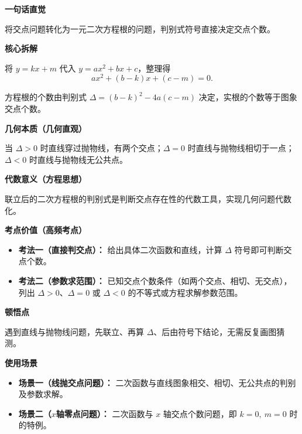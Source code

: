 \begin{explanationbox}
	\textbf{\textcolor{CExplanation}{一句话直觉}}

	将交点问题转化为一元二次方程根的问题，判别式符号直接决定交点个数。

	\medskip
	\textbf{\textcolor{CExplanation}{核心拆解}}
	\begin{description}[style=nextline, leftmargin=2.8em, labelsep=0.5em, itemsep=0.45em]
		\item[\textbf{要点一（代数转化）：}]
		      将 $y=kx+m$ 代入 $y=ax^{2}+bx+c$，整理得
		      \[
			      ax^{2}+(b-k)x+(c-m)=0.
		      \]
		\item[\textbf{要点二（判别式判根）：}]
		      方程根的个数由判别式 $\Delta=(b-k)^{2}-4a(c-m)$ 决定，实根的个数等于图象交点个数。
	\end{description}

	\medskip
	\textbf{\textcolor{CExplanation}{几何本质（几何直观）}}

	当 $\Delta>0$ 时直线穿过抛物线，有两个交点；$\Delta=0$ 时直线与抛物线相切于一点；$\Delta<0$ 时直线与抛物线无公共点。

	\medskip
	\textbf{\textcolor{CExplanation}{代数意义（方程思想）}}

	联立后的二次方程根的判别式是判断交点存在性的代数工具，实现几何问题代数化。

	\medskip
	\textbf{\textcolor{CExplanation}{考点价值（高频考点）}}
	\begin{itemize}[leftmargin=*, itemsep=0.5em, topsep=0.4em]
		\item \textbf{考法一（直接判交点）：} 给出具体二次函数和直线，计算 $\Delta$ 符号即可判断交点个数。
		\item \textbf{考法二（参数求范围）：} 已知交点个数条件（如两个交点、相切、无交点），列出 $\Delta>0$、$\Delta=0$ 或 $\Delta<0$ 的不等式或方程求解参数范围。
	\end{itemize}

	\medskip
	\textbf{\textcolor{CExplanation}{顿悟点}}

	遇到直线与抛物线问题，先联立、再算 $\Delta$、后由符号下结论，无需反复画图猜测。

	\medskip
	\textbf{\textcolor{CExplanation}{使用场景}}
	\begin{itemize}[leftmargin=*, itemsep=0.5em, topsep=0.4em]
		\item \textbf{场景一（线抛交点问题）：} 二次函数与直线图象相交、相切、无公共点的判别及参数求解。
		\item \textbf{场景二（$x$轴零点问题）：} 二次函数与 $x$ 轴交点个数问题，即 $k=0,\ m=0$ 时的特例。
	\end{itemize}
\end{explanationbox}